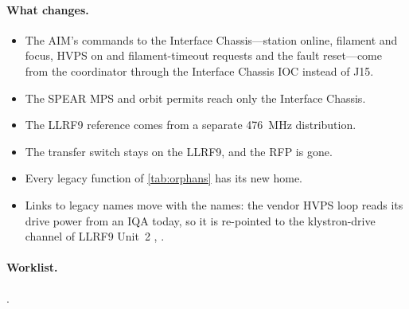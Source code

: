\paragraph{What changes.}
\begin{itemize}
\item The AIM's commands to the Interface Chassis---station online, filament and
focus, HVPS on and filament-timeout requests and the fault reset---come
from the coordinator through the Interface Chassis IOC instead of J15.
\item The SPEAR MPS and orbit permits reach only the Interface Chassis.
\item The LLRF9 reference comes from a separate \qty{476}{\mega\hertz} distribution.
\item The transfer switch stays on the LLRF9, and the RFP is gone.
\item Every legacy function of \cref{tab:orphans} has its new home.
\item Links to legacy names move with the names: the vendor HVPS loop reads its drive
power from an IQA today, so it is re-pointed to the klystron-drive channel of LLRF9
Unit~2 , .
\end{itemize}

\paragraph{Worklist.} .

